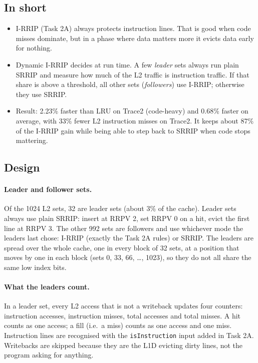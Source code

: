 \documentclass[11pt]{article}
\begin{document}
\subsection{In short}
\begin{itemize}
  \item I-RRIP (Task 2A) always protects instruction lines. That is good when
        code misses dominate, but in a phase where data matters more it evicts
        data early for nothing.
  \item Dynamic I-RRIP decides at run time. A few \emph{leader} sets always run
        plain SRRIP and measure how much of the L2 traffic is instruction
        traffic. If that share is above a threshold, all other sets
        (\emph{followers}) use I-RRIP; otherwise they use SRRIP.
  \item Result: 2.23\% faster than LRU on Trace2 (code-heavy) and 0.68\% faster
        on average, with 33\% fewer L2 instruction misses on Trace2. It keeps
        about 87\% of the I-RRIP gain while being able to step back to SRRIP
        when code stops mattering.
\end{itemize}

\subsection{Design}

\paragraph{Leader and follower sets.}
Of the 1024 L2 sets, 32 are leader sets (about 3\% of the cache). Leader sets
always use plain SRRIP: insert at RRPV 2, set RRPV 0 on a hit, evict the first
line at RRPV 3. The other 992 sets are followers and use whichever mode the
leaders last chose: I-RRIP (exactly the Task 2A rules) or SRRIP. The leaders are
spread over the whole cache, one in every block of 32 sets, at a position that
moves by one in each block (sets 0, 33, 66, \ldots, 1023), so they do not all
share the same low index bits.

\paragraph{What the leaders count.}
In a leader set, every L2 access that is not a writeback updates four counters:
instruction accesses, instruction misses, total accesses and total misses. A hit
counts as one access; a fill (i.e.\ a miss) counts as one access and one miss.
Instruction lines are recognised with the \texttt{isInstruction} input added in
Task 2A. Writebacks are skipped because they are the L1D evicting dirty lines,
not the program asking for anything.
\end{document}
